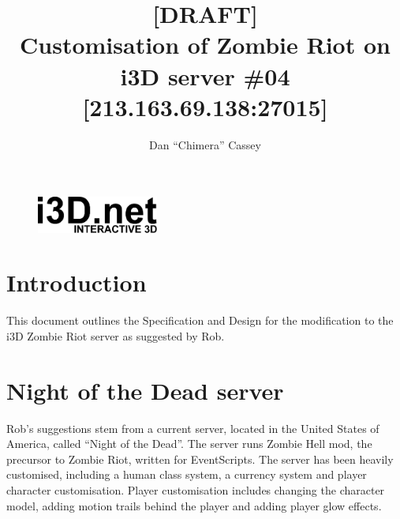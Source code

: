 \documentclass[a4paper, 11pt]{article}
\begin{document}
\title{[DRAFT]\\Customisation of Zombie Riot on\\i3D server \#04 [213.163.69.138:27015]}
\author{Dan ``Chimera'' Cassey}
\begin{figure}
\vspace{-20pt}
\includegraphics[width=4cm]{i3D_logo.pdf}
\vspace{-60pt}
\end{figure}
\maketitle
\section{Introduction}
This document outlines the Specification and Design for the modification to the i3D Zombie Riot server as suggested by Rob.
\section{Night of the Dead server}
Rob's suggestions stem from a current server, located in the United States of America, called ``Night of the Dead''. The server runs Zombie Hell mod, the precursor to Zombie Riot, written for EventScripts. The server has been heavily customised, including a human class system, a currency system and player character customisation. Player customisation includes changing the character model, adding motion trails behind the player and adding player glow effects.
\end{document}
